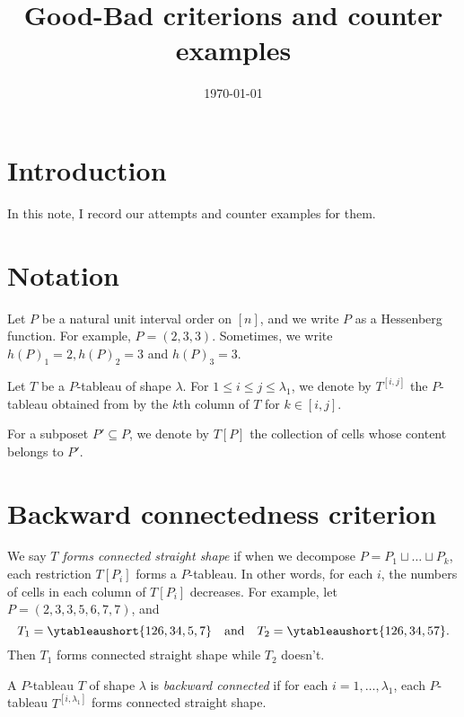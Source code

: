 \documentclass[11pt,reqno]{amsart}
\title{Good-Bad criterions and counter examples}
\date{\today}
\theoremstyle{definition}
\theoremstyle{remark}
\numberwithin{equation}{section}
\newcommand\qand{\quad\mbox{and}\quad}
\begin{document}
\maketitle

\section{Introduction}
In this note, I record our attempts and counter examples for them.

\section*{Notation}
Let \( P \) be a natural unit interval order on \( [n] \), and we write \( P \) as a Hessenberg
function. For example, \( P=(2,3,3) \). Sometimes, we write \( h(P)_1 = 2, h(P)_2 = 3 \) and
\( h(P)_3 = 3 \).

Let \( T \) be a \( P \)-tableau of shape \( \lambda \).
For \( 1\le i\le j\le \lambda_1 \), we denote by \( T^{[i,j]} \) the \( P \)-tableau
obtained from by the \( k \)th column of \( T \) for \( k\in[i,j] \).

For a subposet \( P'\subseteq P \), we denote by \( T[P] \) the collection of cells
whose content belongs to \( P' \).

\section{Backward connectedness criterion}
We say \emph{\( T \) forms connected straight shape} if when we decompose \( P=P_1 \sqcup \dots \sqcup P_k \), each restriction \( T[P_i] \) forms a \( P \)-tableau. In other words, for each
\( i \), the numbers of cells in each column of \( T[P_i] \) decreases.
For example, let \( P=(2,3,3,5,6,7,7) \), and
\[
  T_1 = \ytableaushort{126,34,5,7} \qand T_2 = \ytableaushort{126,34,57}.
\]
Then \( T_1 \) forms connected straight shape while \( T_2 \) doesn't.

A \( P \)-tableau \( T \) of shape \( \lambda \) is \emph{backward connected}
if for each \( i=1,\dots,\lambda_1 \), each \( P \)-tableau \( T^{[i,\lambda_1]} \) forms
connected straight shape.
\end{document}
